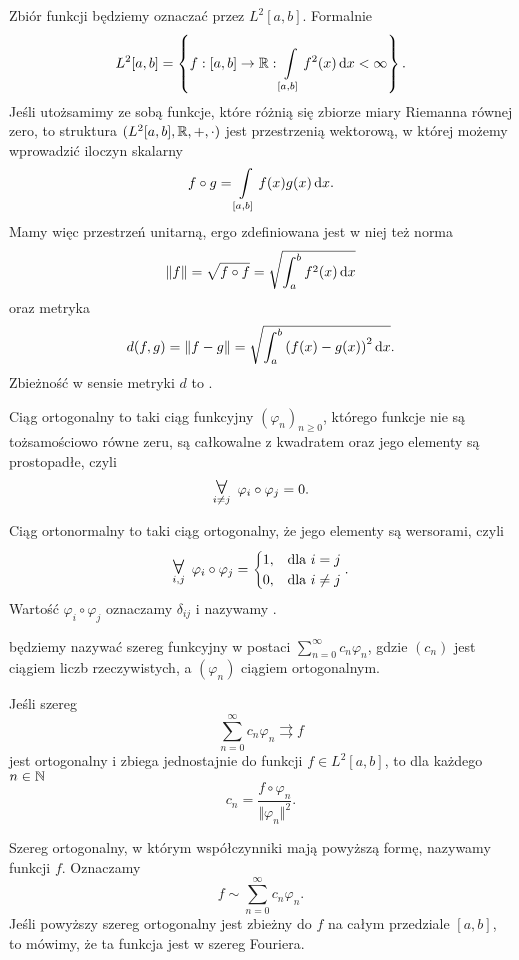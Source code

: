 Zbiór funkcji  będziemy oznaczać przez $L^2[a, b]$. Formalnie
\[ L^2[a, b] = \left\{f: [a, b] \to \mathbb R : \int\limits_{[a, b]} f^2(x) \operatorname{d}\!{x} < \infty \right\}. \]
Jeśli utożsamimy ze sobą funkcje, które różnią się zbiorze miary Riemanna równej zero, to struktura $(L^2[a, b], \mathbb R, +, \cdot)$ jest przestrzenią wektorową, w której możemy wprowadzić iloczyn skalarny
\[ f \circ g = \int\limits_{[a, b]} f(x)g(x) \operatorname{d}\!{x}. \]
Mamy więc przestrzeń unitarną, ergo zdefiniowana jest w niej też norma
\[ \Vert f \Vert = \sqrt{f \circ f} = \sqrt{\int_a^b f^2(x) \operatorname{d}\!{x}} \]
oraz metryka
\[ d(f, g) = \Vert f - g \Vert = \sqrt{\int_a^b \left(f(x) - g(x)\right)^2 \operatorname{d}\!{x}}. \]
Zbieżność w sensie metryki $d$ to .

\begin{definition}
    Ciąg ortogonalny to taki ciąg funkcyjny $(\varphi_n)_{n\geq 0}$, którego funkcje nie są tożsamościowo równe zeru, są całkowalne z kwadratem oraz jego elementy są prostopadłe, czyli
    \[ \dforall{i \neq j} \varphi_i \circ \varphi_j = 0. \]
\end{definition}

\begin{definition}
    Ciąg ortonormalny to taki ciąg ortogonalny, że jego elementy są wersorami, czyli
    \[ \dforall{i, j} \varphi_i \circ \varphi_j = \begin{cases}1, & \text{dla } i = j \\ 0, & \text{dla } i \neq j\end{cases}. \]
    Wartość $\varphi_i \circ \varphi_j$ oznaczamy $\delta_{ij}$ i nazywamy .
\end{definition}

 będziemy nazywać szereg funkcyjny w postaci $\sum_{n=0}^\infty c_n\varphi_n$, gdzie $(c_n)$ jest ciągiem liczb rzeczywistych, a $(\varphi_n)$ ciągiem ortogonalnym.

\begin{theorem}
    \label{t:Euler-Fourier}
    Jeśli szereg
    \[ \sum_{n=0}^\infty c_n\varphi_n \rightrightarrows f \]
    jest ortogonalny i zbiega jednostajnie do funkcji $f \in L^2[a, b]$, to dla każdego $n \in \mathbb N$
    \[ c_n = \frac{f \circ \varphi_n}{\Vert \varphi_n \Vert^2}. \]
\end{theorem}

Szereg ortogonalny, w którym współczynniki mają powyższą formę, nazywamy  funkcji $f$. Oznaczamy
\[ f \sim \sum_{n=0}^\infty c_n\varphi_n. \]
Jeśli powyższy szereg ortogonalny jest zbieżny do $f$ na całym przedziale $[a, b]$, to mówimy, że ta funkcja jest  w szereg Fouriera.

